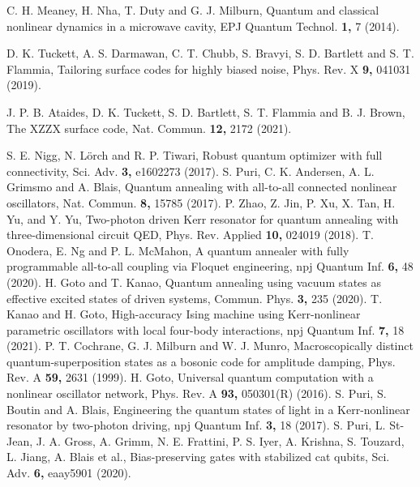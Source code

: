 \documentclass[%
 reprint,
 amsmath,amssymb,
 aps,
pra,
]{revtex4-2}
\begin{document}
\begin{thebibliography}{99}
 C. H. Meaney, H. Nha, T. Duty and  G. J. Milburn, 
Quantum and classical nonlinear dynamics in a microwave cavity,
EPJ Quantum Technol. {\bf 1,} 7 (2014). 




D. K. Tuckett, A. S. Darmawan, C. T. Chubb, S. Bravyi, S. D. Bartlett and S. T. Flammia, 
Tailoring surface codes for highly biased noise,
Phys. Rev. X {\bf 9,} 041031 (2019).

 J. P. B. Ataides, D. K. Tuckett, S. D. Bartlett, S. T. Flammia and B. J. Brown, 
The XZZX surface code,
{Nat. Commun.} {\bf 12,} 2172 (2021).



 S. E. Nigg, N. L\"{o}rch and R. P. Tiwari, 
Robust quantum optimizer with full connectivity,
{Sci. Adv.} {\bf 3,} e1602273 (2017).
 S. Puri, C. K. Andersen, A. L. Grimsmo and A. Blais, 
Quantum annealing with all-to-all connected nonlinear oscillators,
{Nat. Commun.} {\bf 8,} 15785 (2017).
 P. Zhao, Z. Jin, P. Xu, X. Tan, H. Yu, and Y. Yu, 
Two-photon driven Kerr resonator for quantum annealing with three-dimensional circuit QED,
Phys. Rev. Applied {\bf 10,} 024019 (2018).
 T. Onodera, E. Ng and P. L. McMahon, 
A quantum annealer with fully programmable all-to-all coupling via Floquet engineering,
npj Quantum Inf. {\bf 6,} 48 (2020).
 H. Goto and T. Kanao, 
Quantum annealing using vacuum states as effective excited states of driven systems,
Commun. Phys. {\bf 3, } 235 (2020). 
 T. Kanao and H. Goto, 
High-accuracy Ising machine using Kerr-nonlinear parametric oscillators with local four-body interactions,
{npj Quantum Inf.} {\bf 7,} 18 (2021).
 P. T. Cochrane, G. J. Milburn and W. J. Munro, 
Macroscopically distinct quantum-superposition states as a bosonic code for amplitude damping,
Phys. Rev. A {\bf 59,} 2631 (1999).
 H. Goto, 
Universal quantum computation with a nonlinear oscillator network,
{Phys. Rev.} A {\bf 93,} 050301(R) (2016).
 S. Puri, S. Boutin and A. Blais, 
Engineering the quantum states of light in a Kerr-nonlinear resonator by two-photon driving,
{npj Quantum Inf.} {\bf 3,} 18 (2017).
 S. Puri, L. St-Jean, J. A. Gross, A. Grimm, N. E. Frattini, P. S. Iyer,
A. Krishna, S. Touzard, L. Jiang, A. Blais et al., 
Bias-preserving gates with stabilized cat qubits,
{Sci. Adv.} {\bf 6,} eaay5901 (2020).



\end{thebibliography}
\end{document}
